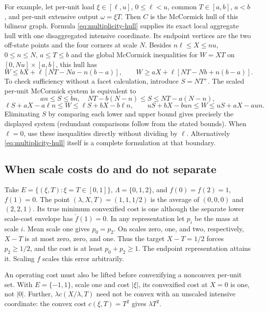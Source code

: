 For example, let per-unit load $\xi\in[\ell,u]$, $0\le\ell<u$, common
$T\in[a,b]$, $a<b$, and per-unit extensive output $\omega=\xi T$.
Then $C$ is the McCormick hull of this bilinear graph. Formula
\eqref{eq:multiplicity-hull} supplies its exact local aggregate hull with
one disaggregated intensive coordinate. Its endpoint vertices are the two
off-state points and the four corners at scale $N$. Besides
$n\ell\le X\le nu$, $0\le n\le N$, $a\le T\le b$ and the global
McCormick inequalities for $W=XT$ on $[0,Nu]\times[a,b]$, this hull has
\begin{equation}\label{eq:scale-bilinear-cuts}
 W\le bX+\ell[NT-Na-n(b-a)],\qquad
 W\ge aX+\ell[NT-Nb+n(b-a)].
\end{equation}
To check sufficiency without a facet calculation, introduce $S=NT^+$.
The scaled per-unit McCormick system is equivalent to
\[
 an\le S\le bn,\quad N T-b(N-n)\le S\le NT-a(N-n),
\]
\[
 \ell S+aX-a\ell n\le W\le\ell S+bX-b\ell n,
 \qquad uS+bX-bun\le W\le uS+aX-aun.
\]
Eliminating $S$ by comparing each lower and upper bound gives precisely
the displayed system (redundant comparisons follow from the stated
bounds). When $\ell=0$, use these inequalities directly without dividing
by $\ell$. Alternatively \eqref{eq:multiplicity-hull} itself is a complete
formulation at that boundary.

\subsection{When scale costs do and do not separate}
\begin{example}
\label{ex:scale-cost}
Take $E=\{(\xi,T):\xi=T\in[0,1]\}$, $\Lambda=\{0,1,2\}$, and
$f(0)=f(2)=1$, $f(1)=0$. The point $(\lambda,X,T)=(1,1,1/2)$ is the
average of $(0,0,0)$ and $(2,2,1)$. Its true minimum convexified cost
is one although the separate lower scale-cost envelope has $\check f(1)=0$.
In any representation let $p_i$ be the mass at scale $i$. Mean scale one
gives $p_0=p_2$. On scales zero, one, and two, respectively, $X-T$ is
at most zero, zero, and one. Thus the target $X-T=1/2$ forces
$p_2\ge1/2$, and the cost is at least $p_0+p_2\ge1$. The endpoint
representation attains it. Scaling $f$ scales this error arbitrarily.
\end{example}
An operating cost must also be lifted before convexifying a nonconvex
per-unit set. With $E=\{-1,1\}$, scale one and cost $|\xi|$, its
convexified cost at $X=0$ is one, not $|0|$. Further,
$\lambda c(X/\lambda,T)$ need not be convex with an unscaled intensive
coordinate: the convex cost $c(\xi,T)=T^2$ gives $\lambda T^2$.

